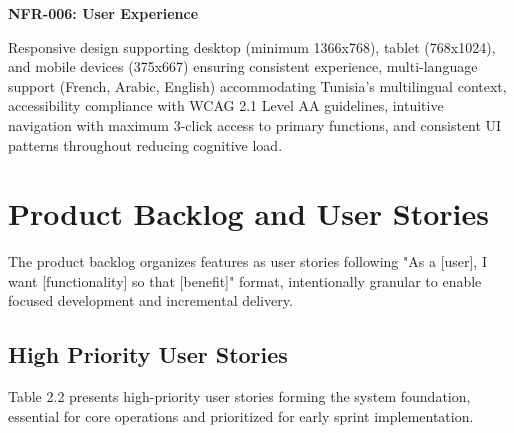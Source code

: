 \textbf{NFR-006: User Experience}

Responsive design supporting desktop (minimum 1366x768), tablet (768x1024), and mobile devices (375x667) ensuring consistent experience, multi-language support (French, Arabic, English) accommodating Tunisia's multilingual context, accessibility compliance with WCAG 2.1 Level AA guidelines, intuitive navigation with maximum 3-click access to primary functions, and consistent UI patterns throughout reducing cognitive load.

\section{Product Backlog and User Stories}

The product backlog organizes features as user stories following "As a [user], I want [functionality] so that [benefit]" format, intentionally granular to enable focused development and incremental delivery.

\subsection{High Priority User Stories}

Table 2.2 presents high-priority user stories forming the system foundation, essential for core operations and prioritized for early sprint implementation.


